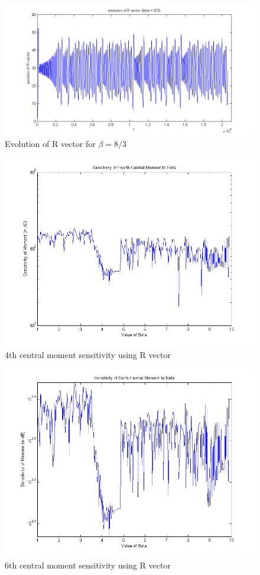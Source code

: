 \documentclass{article}[11pt]
\begin{document}
\begin{figure}[H]
\centering
\includegraphics[scale = 0.6]{REvolution.png}
\caption{Evolution of R vector for $\beta = 8/3$}
\label{fig:REvolution}
\end{figure}
\begin{figure}[H]
\centering
\includegraphics[scale = 0.6]{RSensitivityFourth.png}
\caption{4th central moment sensitivity using R vector}
\label{fig:4thR}
\end{figure}
\begin{figure}[H]
\centering
\includegraphics[scale = 0.6]{RSensitivitySixth.png}
\caption{6th central moment sensitivity using R vector}
\label{fig:6thR}
\end{figure}
\end{document}
